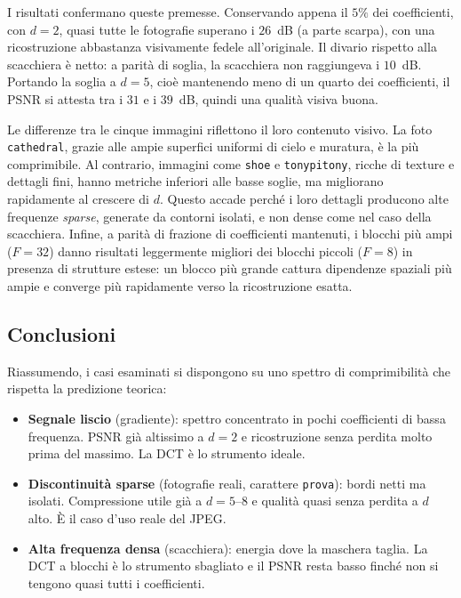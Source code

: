 \documentclass[11pt,a4paper]{article}
\makeatletter
\let\@origtexttt\texttt
\renewcommand{\texttt}[1]{{\def\_{\textunderscore\discretionary{}{}{}}\@origtexttt{#1}}}
\makeatother
\begin{document}
I risultati confermano queste premesse. Conservando appena il
$5\%$ dei coefficienti, con $d=2$, quasi tutte le fotografie superano i
$26$~dB (a parte scarpa), con una ricostruzione abbastanza visivamente fedele all'originale.
Il divario rispetto alla scacchiera è netto: a parità di soglia, la
scacchiera non raggiungeva i $10$~dB.
Portando la soglia a $d=5$, cioè mantenendo meno di
un quarto dei coefficienti, il PSNR si attesta tra i $31$ e i $39$~dB, quindi una qualità visiva buona.

Le differenze tra le cinque immagini riflettono il loro contenuto visivo.
La foto \texttt{cathedral}, grazie alle ampie superfici
uniformi di cielo e muratura, è la più comprimibile. Al contrario,
immagini come \texttt{shoe} e \texttt{tonypitony}, ricche di texture e
dettagli fini, hanno metriche inferiori alle basse soglie, ma migliorano
rapidamente al crescere di $d$. Questo accade perché
i loro dettagli producono alte frequenze \emph{sparse}, generate da
contorni isolati, e non dense come nel caso della scacchiera. Infine,
a parità di frazione di coefficienti mantenuti,
i blocchi più ampi ($F=32$) danno risultati leggermente migliori dei blocchi
piccoli ($F=8$) in presenza di strutture estese: un blocco più
grande cattura dipendenze spaziali più ampie e
converge più rapidamente verso la ricostruzione esatta.

\subsection{Conclusioni}

Riassumendo, i casi esaminati si dispongono su uno spettro di
comprimibilità che rispetta la predizione teorica:

\begin{itemize}
  \item \textbf{Segnale liscio} (gradiente): spettro concentrato in pochi
        coefficienti di bassa frequenza. PSNR già altissimo a $d=2$ e
        ricostruzione senza perdita molto prima del massimo. La DCT è lo strumento ideale.
  \item \textbf{Discontinuità sparse} (fotografie reali, carattere
        \texttt{prova}): bordi netti ma isolati. Compressione utile già a
        $d=5$--$8$ e qualità quasi senza perdita a $d$ alto. È il caso d'uso
        reale del JPEG.
  \item \textbf{Alta frequenza densa} (scacchiera): energia dove la maschera
        taglia. La DCT a blocchi è lo strumento sbagliato e il PSNR resta
        basso finché non si tengono quasi tutti i coefficienti.
\end{itemize}
\end{document}
